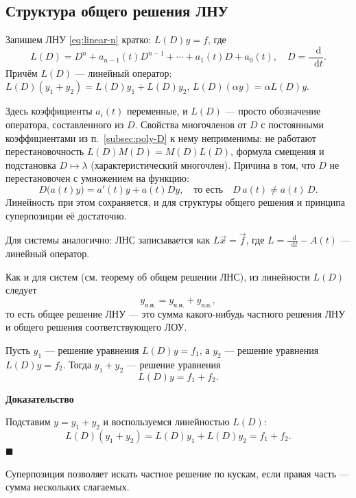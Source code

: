 \documentclass[12pt,a4paper]{article}
\numberwithin{equation}{section}
\newcommand{\vect}[1]{\vec{#1}}
\newcommand{\dd}{\mathop{}\!\mathrm{d}}
\renewenvironment{proof}[1][Доказательство]{\begin{center}\textbf{#1}\end{center}}{\hfill$\blacksquare$\par}
\DeclareRobustCommand{\examtag}[1]{\space{\normalfont\small\color{HSEgray}(#1)}}
\begin{document}
\subsection{Структура общего решения ЛНУ\examtag{вопрос~21}}

Запишем ЛНУ \eqref{eq:linear-n} кратко: \(L(D)y=f\), где
\[
L(D)=D^n+a_{n-1}(t)D^{n-1}+\cdots+a_1(t)D+a_0(t),\quad D=\frac{\dd}{\dd t}.
\]
Причём \(L(D)\) --- линейный оператор: \(L(D)(y_1+y_2)=L(D)y_1+L(D)y_2\), \(L(D)(\alpha y)=\alpha L(D)y\).

\label{rem:LD-variable}
\begin{remarkHSE}
Здесь коэффициенты \(a_i(t)\) переменные, и \(L(D)\) --- просто обозначение оператора, составленного из \(D\). Свойства многочленов от \(D\) с постоянными коэффициентами из п.~\ref{subsec:poly-D} к нему неприменимы: не работают перестановочность \(L(D)M(D)=M(D)L(D)\), формула смещения и подстановка \(D\mapsto\lambda\) (характеристический многочлен). Причина в том, что \(D\) не перестановочен с умножением на функцию:
\[
D\bigl(a(t)y\bigr)=a'(t)y+a(t)Dy,\quad\text{то есть}\quad D\,a(t)\neq a(t)\,D.
\]
Линейность при этом сохраняется, и для структуры общего решения и принципа суперпозиции её достаточно.
\end{remarkHSE}

Для системы аналогично: ЛНС записывается как \(L\vect{x}=\vect{f}\), где \({L=\frac{\dd}{\dd t}-A(t)}\) --- линейный оператор.

Как и для систем (см. теорему об общем решении ЛНС), из линейности \(L(D)\) следует
\[
y_{\text{о.н.}}=y_{\text{ч.н.}}+y_{\text{о.о.}},
\]
то есть общее решение ЛНУ --- это сумма какого-нибудь частного решения ЛНУ и общего решения соответствующего ЛОУ.

\begin{theoremHSE}
Пусть \(y_1\) --- решение уравнения \(L(D)y=f_1\), а \(y_2\) --- решение уравнения \(L(D)y=f_2\). Тогда \(y_1+y_2\) --- решение уравнения
\[
L(D)y=f_1+f_2.
\]
\end{theoremHSE}

\begin{proof}
Подставим \(y=y_1+y_2\) и воспользуемся линейностью \(L(D)\):
\[
L(D)(y_1+y_2)=L(D)y_1+L(D)y_2=f_1+f_2.
\]
\end{proof}

Суперпозиция позволяет искать частное решение по кускам, если правая часть --- сумма нескольких слагаемых.
\end{document}
